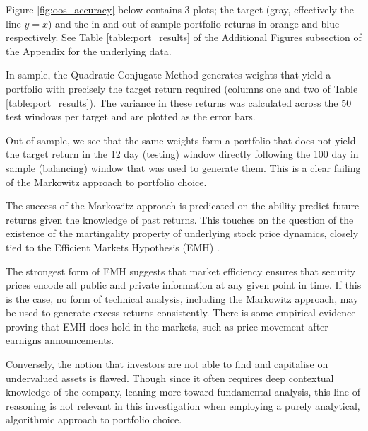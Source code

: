 \documentclass{article}
\begin{document}
Figure \ref{fig:oos_accuracy} below contains 3 plots; the target (gray, effectively the line $y=x$) and the in and out of sample portfolio returns in orange and blue respectively. See Table \ref{table:port_results} of the \hyperref[sec:add_figs]{Additional Figures} subsection of the Appendix for the underlying data.

In sample, the Quadratic Conjugate Method generates weights that yield a portfolio with precisely the target return required (columns one and two of Table \ref{table:port_results}). The variance in these returns was calculated across the 50 test windows per target and are plotted as the error bars. 

Out of sample, we see that the same weights form a portfolio that does not yield the target return in the 12 day (testing) window directly following the 100 day in sample (balancing) window that was used to generate them. This is a clear failing of the Markowitz approach to portfolio choice. 


The success of the Markowitz approach is predicated on the ability predict future returns given the knowledge of past returns. This touches on the question of the existence of the martingality property of underlying stock price dynamics, closely tied to the Efficient Markets Hypothesis (EMH) \cite{martingale}. 

The strongest form of EMH suggests that market efficiency ensures that security prices encode all public and private information at any given point in time. If this is the case, no form of technical analysis, including the Markowitz approach, may be used to generate excess returns consistently. There is some empirical evidence proving that EMH does hold in the markets, such as price movement after earnigns announcements. 

Conversely, the notion that investors are not able to find and capitalise on undervalued assets is flawed. Though since it often requires deep contextual knowledge of the company, leaning more toward fundamental analysis, this line of reasoning is not relevant in this investigation when employing a purely analytical, algorithmic approach to portfolio choice.
\end{document}
